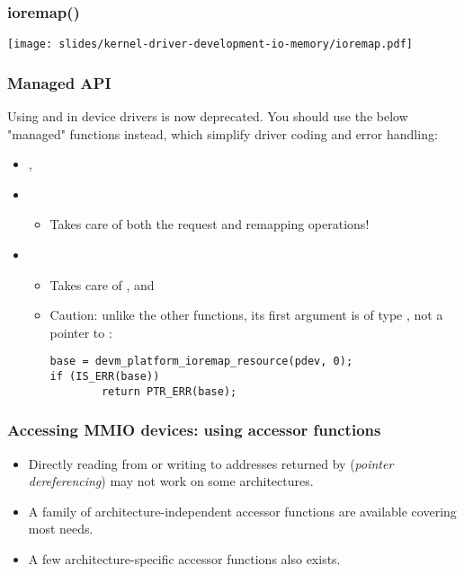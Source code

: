 \begin{frame}[fragile]
  \frametitle{ioremap()}
  \begin{center}
    \texttt{[image: slides/kernel-driver-development-io-memory/ioremap.pdf]}\\
  \end{center}
\end{frame}

\begin{frame}[fragile]
  \frametitle{Managed API}
  Using  and  in device
  drivers is now deprecated. You should use the below "managed"
  functions instead, which simplify driver coding and error handling:
  \begin{itemize}
  \item {}, 
  \item {}
        \begin{itemize}
        \item Takes care of both the request and remapping operations!
	\end{itemize}
  \item {}
        \begin{itemize}
        \item Takes care of ,
                 and 
        \item Caution: unlike the other  functions, its
              first argument is of type , not a
              pointer to :
        \begin{block}{}
        \begin{verbatim}
base = devm_platform_ioremap_resource(pdev, 0);
if (IS_ERR(base))
        return PTR_ERR(base);
        \end{verbatim}
        \end{block}{}
        \end{itemize}
  \end{itemize}
\end{frame}

\begin{frame}[fragile]
  \frametitle{Accessing MMIO devices: using accessor functions}
  \begin{itemize}
  \item Directly reading from or writing to addresses returned by
     (\emph{pointer dereferencing}) may not work on some
    architectures.
  \item A family of architecture-independent accessor functions are
    available covering most needs.
  \item A few architecture-specific accessor functions also exists.
  \end{itemize}
\end{frame}

